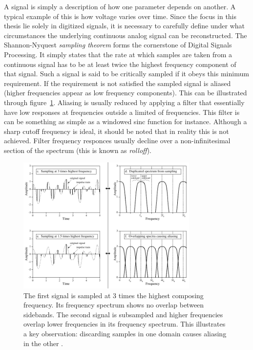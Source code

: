 \documentclass[a4paper,10pt]{report}
\begin{document}
A signal is simply a description of how one parameter depends on another. A typical example of this is how voltage varies over time. Since the focus in this thesis lie solely in digitized signals, it is necessary to carefully
define under what circumstances the underlying continuous analog signal can be reconstructed. The Shannon-Nyquest \textit{sampling theorem} forms the cornerstone of Digital Signals Processing. It simply states that the rate at
which samples are taken from a continuous signal has to be at least twice the highest frequency component of that signal. Such a signal is said to be critically sampled if it obeys this minimum requirement. If the requirement is
not satisfied the sampled signal is aliased (higher frequencies appear as low frequency components). This can be illustrated through figure~\ref{fig_invalid_sampling}. Aliasing is usually reduced by applying a filter that essentially
have low responses at frequencies outside a limited  of frequencies. This filter is can be something as simple as a windowed sinc function for instance. Although a sharp cutoff frequency is ideal, it should be noted 
that in reality this is not achieved. Filter frequency responces usually decline over a non-infinitesimal section of the spectrum (this is known as \textit{rolloff}).

\begin{figure}[ht]
 \begin{mdframed}
 \centering
 \includegraphics[width=0.8\textwidth]{images/improper_sampling.png}
 \caption[Aliasing]{The first signal is sampled at 3 times the highest composing frequency. Its frequency spectrum shows no overlap between sidebands. The second signal is subsampled and higher frequencies overlap lower frequencies
 in its frequency spectrum. This illustrates a key observation: discarding samples in one domain causes aliasing in the other \cite{smith1997scientist}.}
 \label{fig_invalid_sampling}
 \end{mdframed}
\end{figure}
\end{document}
